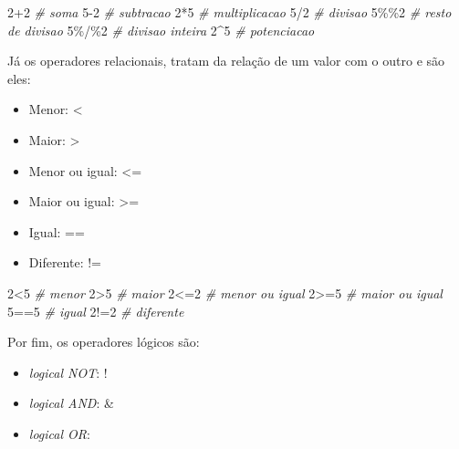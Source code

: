 \documentclass[
]{book}
\newenvironment{Shaded}{\begin{snugshade}}{\end{snugshade}}
\newcommand{\CommentTok}[1]{\textcolor[rgb]{0.56,0.35,0.01}{\textit{#1}}}
\newcommand{\DecValTok}[1]{\textcolor[rgb]{0.00,0.00,0.81}{#1}}
\newcommand{\SpecialCharTok}[1]{\textcolor[rgb]{0.00,0.00,0.00}{#1}}
\providecommand{\tightlist}{%
  \setlength{\itemsep}{0pt}\setlength{\parskip}{0pt}}
\begin{document}
\begin{Shaded}
\begin{Highlighting}[]
\DecValTok{2}\SpecialCharTok{+}\DecValTok{2}   \CommentTok{\# soma}
\DecValTok{5{-}2}   \CommentTok{\# subtracao}
\DecValTok{2}\SpecialCharTok{*}\DecValTok{5}   \CommentTok{\# multiplicacao}
\DecValTok{5}\SpecialCharTok{/}\DecValTok{2}   \CommentTok{\# divisao}
\DecValTok{5}\SpecialCharTok{\%\%}\DecValTok{2}  \CommentTok{\# resto de divisao}
\DecValTok{5}\SpecialCharTok{\%/\%}\DecValTok{2} \CommentTok{\# divisao inteira}
\DecValTok{2}\SpecialCharTok{\^{}}\DecValTok{5}   \CommentTok{\# potenciacao}
\end{Highlighting}
\end{Shaded}

Já os operadores relacionais, tratam da relação de um valor com o outro e são eles:

\begin{itemize}
\tightlist
\item
  Menor: \textless{}
\item
  Maior: \textgreater{}
\item
  Menor ou igual: \textless=
\item
  Maior ou igual: \textgreater=
\item
  Igual: ==
\item
  Diferente: !=
\end{itemize}

\begin{Shaded}
\begin{Highlighting}[]
\DecValTok{2}\SpecialCharTok{\textless{}}\DecValTok{5} \CommentTok{\# menor}
\DecValTok{2}\SpecialCharTok{\textgreater{}}\DecValTok{5} \CommentTok{\# maior}
\DecValTok{2}\SpecialCharTok{\textless{}=}\DecValTok{2} \CommentTok{\# menor ou igual}
\DecValTok{2}\SpecialCharTok{\textgreater{}=}\DecValTok{5} \CommentTok{\# maior ou igual}
\DecValTok{5}\SpecialCharTok{==}\DecValTok{5} \CommentTok{\# igual}
\DecValTok{2}\SpecialCharTok{!=}\DecValTok{2} \CommentTok{\# diferente}
\end{Highlighting}
\end{Shaded}

Por fim, os operadores lógicos são:

\begin{itemize}
\tightlist
\item
  \emph{logical NOT}: !
\item
  \emph{logical AND}: \&
\item
  \emph{logical OR}: \textbar{}
\end{itemize}
\end{document}
